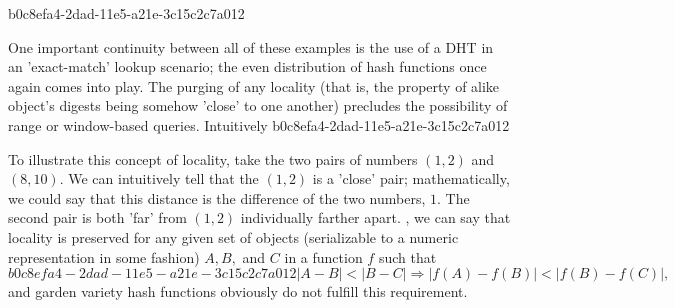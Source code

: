 \documentclass[12pt]{article}
\begin{document}
b0c8efa4-2dad-11e5-a21e-3c15c2c7a012
\par One important continuity between all of these examples is the use of a DHT in an 'exact-match' lookup scenario; the even distribution of hash functions once again comes into play. The purging of any locality (that is, the property of alike object's digests being somehow 'close' to one another) precludes the possibility of range or window-based queries. Intuitively
b0c8efa4-2dad-11e5-a21e-3c15c2c7a012
\par To illustrate this concept of locality, take the two pairs of numbers $(1,2)$ and $(8,10)$. We can intuitively tell that the $(1,2)$ is a 'close' pair; mathematically, we could say that this distance is the difference of the two numbers, $1$. The second pair is both 'far' from $(1,2)$ individually farther apart. , we can say that locality is preserved for any given set of objects (serializable to a numeric representation in some fashion) $A,B,$ and $C$ in a function $f$ such that
\begin{equation}
b0c8efa4-2dad-11e5-a21e-3c15c2c7a012|A-B| < |B-C| \Rightarrow |f(A)-f(B)| < |f(B) - f(C)|,
\end{equation}
and garden variety hash functions obviously do not fulfill this requirement.

\printbibliography
\end{document}
